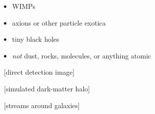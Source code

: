 \documentclass{beamer}
\begin{document}
\begin{frame}
\begin{itemize}
\item WIMPs
\item axions or other particle exotica
\item tiny black holes
\item \emph{not} dust, rocks, molecules, or anything atomic
\end{itemize}
\end{frame}

\begin{frame}
~[direct detection image]
\end{frame}

\begin{frame}
~[simulated dark-matter halo]
\end{frame}

\begin{frame}
~[streams around galaxies]
\end{frame}
\end{document}
